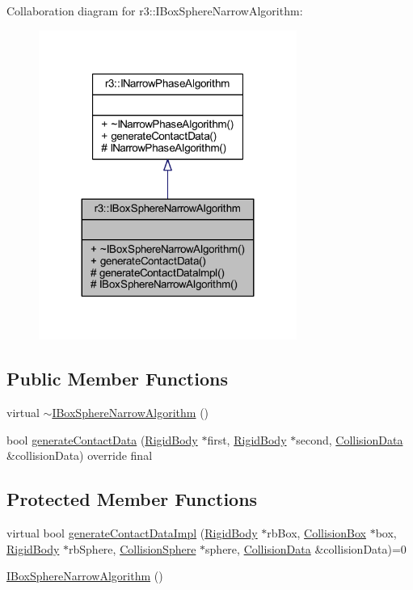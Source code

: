 Collaboration diagram for r3\+:\+:I\+Box\+Sphere\+Narrow\+Algorithm\+:\nopagebreak
\begin{figure}[H]
\begin{center}
\leavevmode
\includegraphics[width=239pt]{classr3_1_1_i_box_sphere_narrow_algorithm__coll__graph}
\end{center}
\end{figure}
\subsection*{Public Member Functions}
\begin{DoxyCompactItemize}
\item 
virtual \mbox{\hyperlink{classr3_1_1_i_box_sphere_narrow_algorithm_ac70f8e99bb2deb52c1e4686ef6fafe2d}{$\sim$\+I\+Box\+Sphere\+Narrow\+Algorithm}} ()
\item 
bool \mbox{\hyperlink{classr3_1_1_i_box_sphere_narrow_algorithm_aeecdb2486c6e6cbae057466f05323bdb}{generate\+Contact\+Data}} (\mbox{\hyperlink{classr3_1_1_rigid_body}{Rigid\+Body}} $\ast$first, \mbox{\hyperlink{classr3_1_1_rigid_body}{Rigid\+Body}} $\ast$second, \mbox{\hyperlink{classr3_1_1_collision_data}{Collision\+Data}} \&collision\+Data) override final
\end{DoxyCompactItemize}
\subsection*{Protected Member Functions}
\begin{DoxyCompactItemize}
\item 
virtual bool \mbox{\hyperlink{classr3_1_1_i_box_sphere_narrow_algorithm_af28bcda3eb527a6ee48a3b624e5d47e0}{generate\+Contact\+Data\+Impl}} (\mbox{\hyperlink{classr3_1_1_rigid_body}{Rigid\+Body}} $\ast$rb\+Box, \mbox{\hyperlink{classr3_1_1_collision_box}{Collision\+Box}} $\ast$box, \mbox{\hyperlink{classr3_1_1_rigid_body}{Rigid\+Body}} $\ast$rb\+Sphere, \mbox{\hyperlink{classr3_1_1_collision_sphere}{Collision\+Sphere}} $\ast$sphere, \mbox{\hyperlink{classr3_1_1_collision_data}{Collision\+Data}} \&collision\+Data)=0
\item 
\mbox{\hyperlink{classr3_1_1_i_box_sphere_narrow_algorithm_ab8b57aa1583fb467fb06998487b2a5a6}{I\+Box\+Sphere\+Narrow\+Algorithm}} ()
\end{DoxyCompactItemize}


